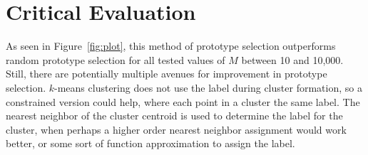 \documentclass[letterpaper,10pt,onecolumn]{IEEEconf}
\begin{document}
\section{Critical Evaluation}

As seen in Figure~\ref{fig:plot}, this method of prototype selection outperforms random prototype selection for all tested values of $M$ between 10 and 10,000. Still, there are potentially multiple avenues for improvement in prototype selection. $k$-means clustering does not use the label during cluster formation, so a constrained version could help, where each point in a cluster the same label. The nearest neighbor of the cluster centroid is used to determine the label for the cluster, when perhaps a higher order nearest neighbor assignment would work better, or some sort of function approximation to assign the label. 
\end{document}
